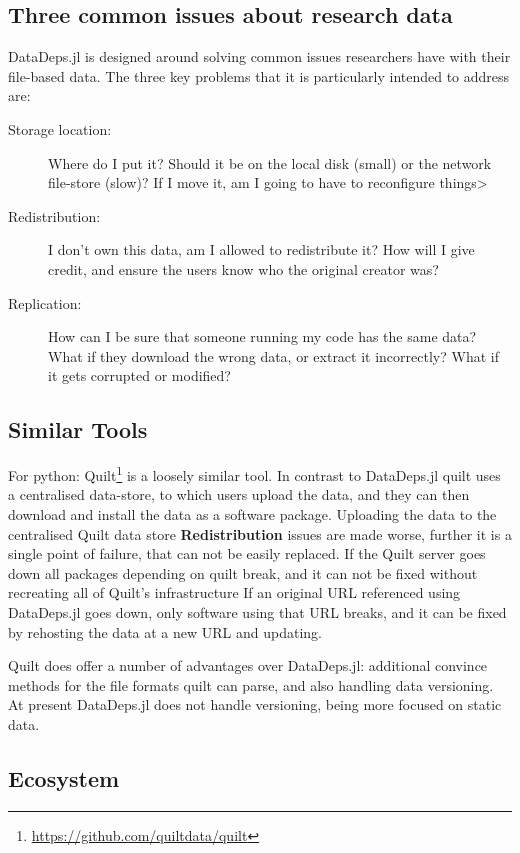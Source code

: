 \documentclass[twoside,11pt]{article}
\begin{document}
\subsection{Three common issues about research data}\label{sec:issues}
DataDeps.jl is designed around solving common issues researchers have with their file-based data.
The three key problems that it is particularly intended to address are:

\begin{description}
	\item[Storage location:] Where do I put it? \label{itm:where}
	Should it be on the local disk (small) or the network file-store (slow)?
	If I move it, am I going to have to reconfigure things>
	\item[Redistribution:] I don't own this data, am I allowed to redistribute it? \label{itm:ownredistribute} 
	How will I give credit, and ensure the users know who the original creator was?
	\item[Replication:] How can I be sure that someone running my code has the same data?
	What if they download the wrong data, or extract it incorrectly?
	What if it gets corrupted or modified?
\end{description}

\subsection{Similar Tools}
For python: Quilt\footnote{\url{https://github.com/quiltdata/quilt}} is a loosely similar tool.
In contrast to DataDeps.jl quilt uses a centralised data-store, to which users upload the data, and they can then download and install the data as a software package.
Uploading the data to the centralised Quilt data store \textbf{Redistribution} issues are made worse, further it is a single point of failure, that can not be easily replaced.
If the Quilt server goes down all packages depending on quilt break, and it can not be fixed without recreating all of Quilt's  infrastructure
If an original URL referenced using DataDeps.jl goes down, only software using that URL breaks, and it can be fixed by rehosting the data at a new URL and updating.

Quilt does offer a number of advantages over DataDeps.jl:
additional convince methods for the file formats quilt can parse,
and also handling data versioning.
At present DataDeps.jl does not handle versioning, being more focused on static data.

\subsection{Ecosystem}
\end{document}
